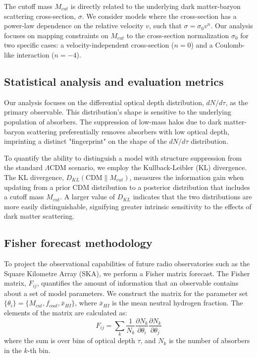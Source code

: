 \documentclass[]{article}
\begin{document}
The cutoff mass $M_{cut}$ is directly related to the underlying dark matter-baryon scattering cross-section, $\sigma$. We consider models where the cross-section has a power-law dependence on the relative velocity $v$, such that $\sigma = \sigma_0 v^n$. Our analysis focuses on mapping constraints on $M_{cut}$ to the cross-section normalization $\sigma_0$ for two specific cases: a velocity-independent cross-section ($n=0$) and a Coulomb-like interaction ($n=-4$).

\subsection{Statistical analysis and evaluation metrics}

Our analysis focuses on the differential optical depth distribution, $dN/d\tau$, as the primary observable. This distribution's shape is sensitive to the underlying population of absorbers. The suppression of low-mass halos due to dark matter-baryon scattering preferentially removes absorbers with low optical depth, imprinting a distinct "fingerprint" on the shape of the $dN/d\tau$ distribution.

To quantify the ability to distinguish a model with structure suppression from the standard $\Lambda$CDM scenario, we employ the Kullback-Leibler (KL) divergence. The KL divergence, $D_{KL}(\text{CDM} \parallel M_{cut})$, measures the information gain when updating from a prior CDM distribution to a posterior distribution that includes a cutoff mass $M_{cut}$. A larger value of $D_{KL}$ indicates that the two distributions are more easily distinguishable, signifying greater intrinsic sensitivity to the effects of dark matter scattering.

\subsection{Fisher forecast methodology}

To project the observational capabilities of future radio observatories such as the Square Kilometre Array (SKA), we perform a Fisher matrix forecast. The Fisher matrix, $F_{ij}$, quantifies the amount of information that an observable contains about a set of model parameters. We construct the matrix for the parameter set $\{\theta_i\} = \{M_{cut}, f_{cool}, \bar{x}_{HI}\}$, where $\bar{x}_{HI}$ is the mean neutral hydrogen fraction. The elements of the matrix are calculated as:
\begin{equation}
F_{ij} = \sum_{k} \frac{1}{N_k} \frac{\partial N_k}{\partial \theta_i} \frac{\partial N_k}{\partial \theta_j}
\end{equation}
where the sum is over bins of optical depth $\tau$, and $N_k$ is the number of absorbers in the $k$-th bin.
\end{document}
